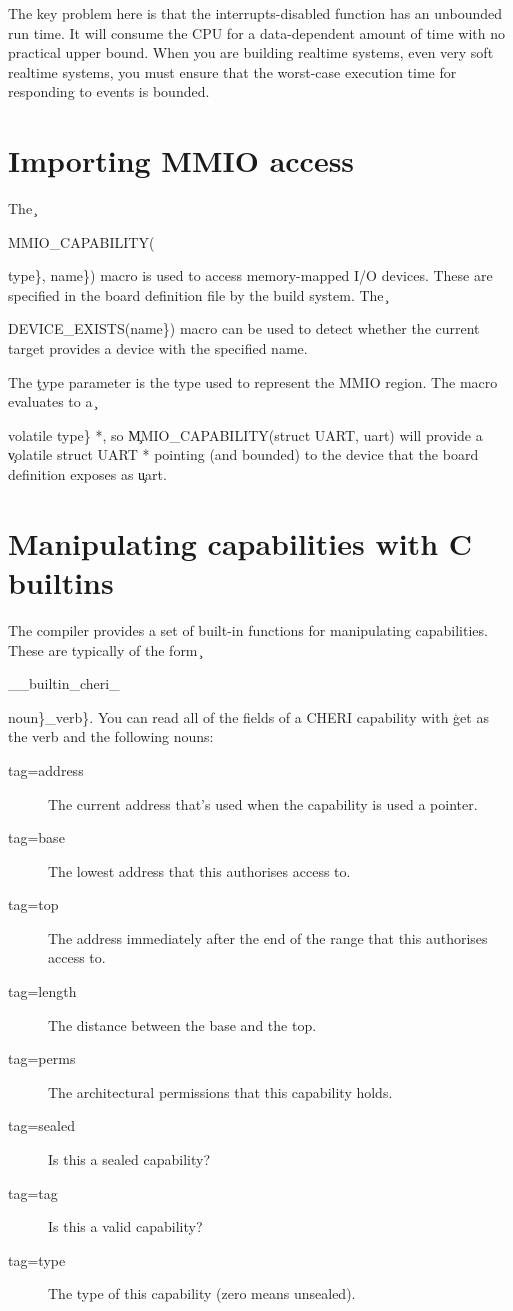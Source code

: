 {{The key problem here is that the interrupts-disabled function has an unbounded run time.
It will consume the CPU for a data-dependent amount of time with no practical upper bound.
When you are building realtime systems, even very soft realtime systems, you must ensure that the worst-case execution time for responding to events is bounded.

\section{Importing MMIO access}

The \c{MMIO_CAPABILITY({type\}, {name\})} macro is used to access memory-mapped I/O devices.
These are specified in the board definition file by the build system.
The \c{DEVICE_EXISTS({name\})} macro can be used to detect whether the current target provides a device with the specified name.

The \c{type} parameter is the type used to represent the MMIO region.
The macro evaluates to a \c{volatile {type\} *}, so \c{MMIO_CAPABILITY(struct UART, uart)} will provide a \c{volatile struct UART *} pointing (and bounded) to the device that the board definition exposes as \c{uart}.

\section{Manipulating capabilities with C builtins}

The compiler provides a set of built-in functions for manipulating capabilities.
These are typically of the form \c{__builtin_cheri_{noun\}_{verb\}}.
You can read all of the fields of a CHERI capability with \c{get} as the verb and the following nouns:

\begin{description}
	\item[tag=address]{The current address that's used when the capability is used a pointer.}
	\item[tag=base]{The lowest address that this authorises access to.}
	\item[tag=top]{The address immediately after the end of the range that this authorises access to.}
	\item[tag=length]{The distance between the base and the top.}
	\item[tag=perms]{The architectural permissions that this capability holds.}
	\item[tag=sealed]{Is this a sealed capability?}
	\item[tag=tag]{Is this a valid capability?}
	\item[tag=type]{The type of this capability (zero means unsealed).}
\end{description}

}}}}}}}}
